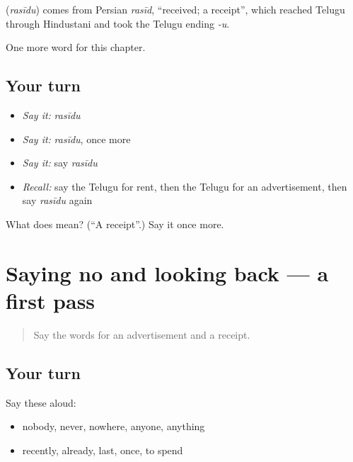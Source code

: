 \begin{cousinweb}
\textbf{} (\emph{rasīdu}) comes from Persian \emph{rasīd}, \textquotedblleft{}received; a receipt\textquotedblright{}, which reached Telugu through Hindustani and took the Telugu ending \emph{-u}.
\end{cousinweb}

\begin{grammarlens}[title={What you've built}]
One more word for this chapter.
\end{grammarlens}

\subsection*{Your turn}
\begin{itemize}
\raggedright
  \item \emph{Say it:} \emph{rasīdu}
  \item \emph{Say it:} \emph{rasīdu}, once more
  \item \emph{Say it:} say \emph{rasīdu}
  \item \emph{Recall:} say the Telugu for rent, then the Telugu for an advertisement, then say \emph{rasīdu} again
\end{itemize}

\begin{tcolorbox}[breakable,colback=teal!4,colframe=teal!35!black,title={Before you move on}]
What does  mean? (\textquotedblleft{}A receipt\textquotedblright{}.) Say it once more.
\end{tcolorbox}
\section[(dialogue)]{Saying no and looking back — a first pass}

\label{lesson:TE-R156-first-pass-saying-no-and-looking-back}



\begin{quote}
Say the words for an advertisement and a receipt.
\end{quote}

\subsection*{Your turn}
Say these aloud:

\begin{itemize}
\raggedright
  \item nobody, never, nowhere, anyone, anything
  \item recently, already, last, once, to spend
\end{itemize}

